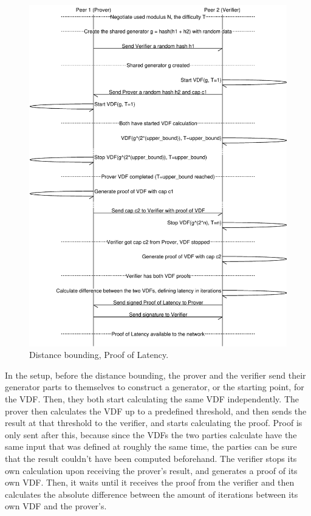 \begin{figure}
	\includegraphics[width=\textwidth]{pictures/pol2_diagram-eps-converted-to.pdf}
	\caption{Distance bounding, Proof of Latency.}
	\label{PoL Diagram 2}
\end{figure}

In the setup, before the distance bounding, the prover and the verifier send their generator parts to themselves to construct a generator, or the starting point, for the VDF. Then, they both start calculating the same VDF independently. The prover then calculates the VDF up to a predefined threshold, and then sends the result at that threshold to the verifier, and starts calculating the proof. Proof is only sent after this, because since the VDFs the two parties calculate have the same input that was defined at roughly the same time, the parties can be sure that the result couldn't have been computed beforehand. The verifier stops its own calculation upon receiving the prover's result, and generates a proof of its own VDF. Then, it waits until it receives the proof from the verifier and then calculates the absolute difference between the amount of iterations between its own VDF and the prover's.

